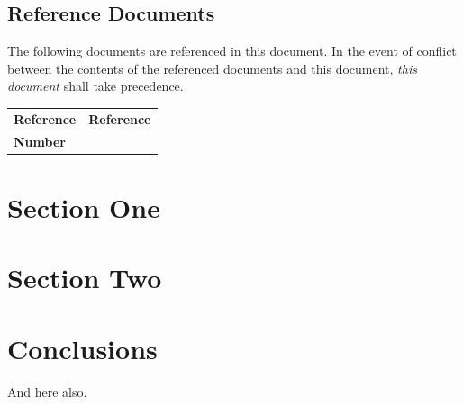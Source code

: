 \documentclass[11pt,a4paper]{article}
\begin{document}
\subsection*{Reference Documents}

The following documents are referenced in this document. In the event of
conflict between the contents of the referenced documents and this document,
\emph{this document} shall take precedence.

\begin{center}{
\begin{tabularx}{\textwidth}{|X|X|}
    \hline
    \bf{Reference} & \bf{Reference}\\
    \bf{Number} & \\
    \hline
\end{tabularx}}
\end{center}



\newpage
\section{Section One}

\section{Section Two}


\clearpage
\section{Conclusions}
\label{section:conclusions}

And here also.


\clearpage
{}
%
\end{document}
